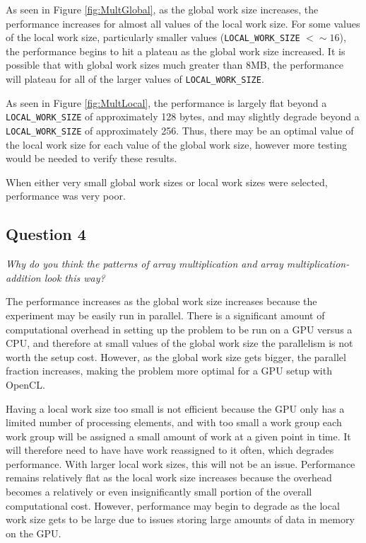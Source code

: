 \documentclass{article}
\begin{document}
As seen in Figure \ref{fig:MultGlobal}, as the global work size increases, the performance increases for almost all values of the local work size.  For some values of the local work size, particularly smaller values (\texttt{LOCAL\_WORK\_SIZE} $< \sim 16$), the performance begins to hit a plateau as the global work size increased.  It is possible that with global work sizes much greater than 8MB, the performance will plateau for all of the larger values of \texttt{LOCAL\_WORK\_SIZE}.

As seen in Figure \ref{fig:MultLocal}, the performance is largely flat beyond a \texttt{LOCAL\_WORK\_SIZE} of approximately 128 bytes, and may slightly degrade beyond a \texttt{LOCAL\_WORK\_SIZE} of approximately 256.  Thus, there may be an optimal value of the local work size for each value of the global work size, however more testing would be needed to verify these results.

When either very small global work sizes or local work sizes were selected, performance was very poor.

\subsection*{Question 4}
\textit{Why do you think the patterns of array multiplication and array multiplication-addition look this way?}

The performance increases as the global work size increases because the experiment may be easily run in parallel.  There is a significant amount of computational overhead in setting up the problem to be run on a GPU versus a CPU, and therefore at small values of the global work size the parallelism is not worth the setup cost.  However, as the global work size gets bigger, the parallel fraction increases, making the problem more optimal for a GPU setup with OpenCL.

Having a local work size too small is not efficient because the GPU only has a limited number of processing elements, and with too small a work group each work group will be assigned a small amount of work at a given point in time.  It will therefore need to have have work reassigned to it often, which degrades performance.  With larger local work sizes, this will not be an issue.  Performance remains relatively flat as the local work size increases because the overhead becomes a relatively or even insignificantly small portion of the overall computational cost.  However, performance may begin to degrade as the local work size gets to be large due to issues storing large amounts of data in memory on the GPU.
\end{document}
